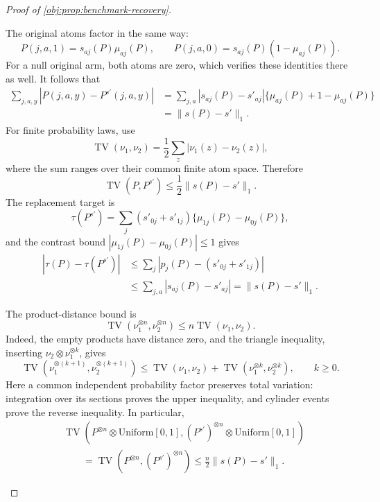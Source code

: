 \begin{proof}[Proof of \cref{obj:prop:benchmark-recovery}]
\begin{enumerate}
The original atoms factor in the same way:
\[
P(j,a,1)=s_{aj}(P)\mu_{aj}(P),
\qquad
P(j,a,0)=s_{aj}(P)(1-\mu_{aj}(P)).
\]
For a null original arm, both atoms are zero, which verifies these identities there as well. It follows that
\[
\begin{aligned}
\sum_{j,a,y}|P(j,a,y)-P^{s'}(j,a,y)|
&=\sum_{j,a}|s_{aj}(P)-s'_{aj}|
   \{\mu_{aj}(P)+1-\mu_{aj}(P)\}\\
&=\|s(P)-s'\|_1.
\end{aligned}
\]
For finite probability laws, use
\[
\operatorname{TV}(\nu_1,\nu_2)
=\frac12\sum_z|\nu_1(z)-\nu_2(z)|,
\]
where the sum ranges over their common finite atom space. Therefore
\[
\operatorname{TV}(P,P^{s'})
\le\frac12\|s(P)-s'\|_1.
\]
The replacement target is
\[
\tau(P^{s'})
=\sum_j(s'_{0j}+s'_{1j})
       \{\mu_{1j}(P)-\mu_{0j}(P)\},
\]
and the contrast bound \(|\mu_{1j}(P)-\mu_{0j}(P)|\le1\) gives
\[
\begin{aligned}
|\tau(P)-\tau(P^{s'})|
&\le
\sum_j|p_j(P)-(s'_{0j}+s'_{1j})|\\
&\le\sum_{j,a}|s_{aj}(P)-s'_{aj}|
=\|s(P)-s'\|_1.
\end{aligned}
\]

The product-distance bound is
\[
\operatorname{TV}(\nu_1^{\otimes n},\nu_2^{\otimes n})
\le n\operatorname{TV}(\nu_1,\nu_2).
\]
Indeed, the empty products have distance zero, and the triangle inequality, inserting
\(\nu_2\otimes\nu_1^{\otimes k}\), gives
\[
\operatorname{TV}(\nu_1^{\otimes(k+1)},\nu_2^{\otimes(k+1)})
\le
\operatorname{TV}(\nu_1,\nu_2)
+\operatorname{TV}(\nu_1^{\otimes k},\nu_2^{\otimes k}),
\qquad k\ge0.
\]
Here a common independent probability factor preserves total variation: integration over its sections proves the upper inequality, and cylinder events prove the reverse inequality. In particular,
\[
\begin{aligned}
&\operatorname{TV}\!\left(
P^{\otimes n}\otimes\mathrm{Uniform}[0,1],
(P^{s'})^{\otimes n}\otimes\mathrm{Uniform}[0,1]\right)\\
&\qquad=
\operatorname{TV}(P^{\otimes n},(P^{s'})^{\otimes n})
\le \frac n2\|s(P)-s'\|_1.
\end{aligned}
\]


\end{enumerate}
\end{proof}
